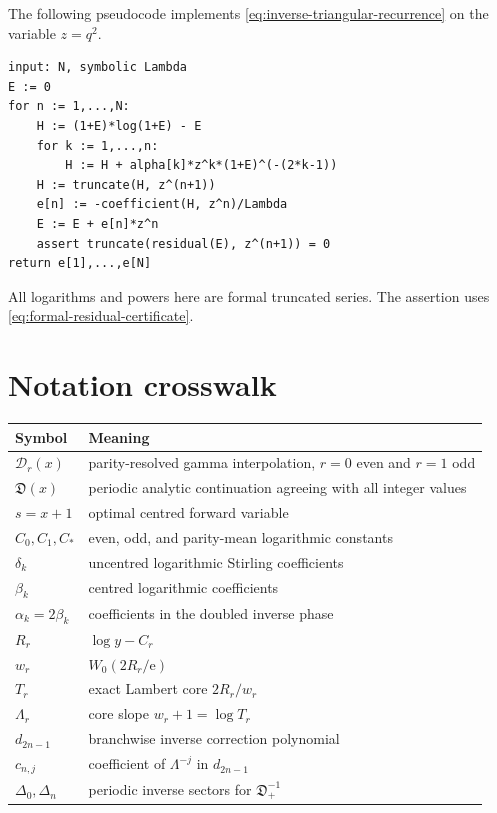 \documentclass[11pt,a4paper,oneside]{article}
\theoremstyle{plain}
\theoremstyle{definition}
\theoremstyle{remark}
\newcommand{\e}{\mathrm e}
\newcommand{\D}{\mathcal D}
\newcommand{\DO}{\mathfrak D}
\begin{document}
The following pseudocode implements \cref{eq:inverse-triangular-recurrence}
on the variable $z=q^2$.
\begin{lstlisting}
input: N, symbolic Lambda
E := 0
for n := 1,...,N:
    H := (1+E)*log(1+E) - E
    for k := 1,...,n:
        H := H + alpha[k]*z^k*(1+E)^(-(2*k-1))
    H := truncate(H, z^(n+1))
    e[n] := -coefficient(H, z^n)/Lambda
    E := E + e[n]*z^n
    assert truncate(residual(E), z^(n+1)) = 0
return e[1],...,e[N]
\end{lstlisting}
All logarithms and powers here are formal truncated series.  The assertion uses
\cref{eq:formal-residual-certificate}.

\section{Notation crosswalk}
\label{app:crosswalk}

\begin{center}
\begin{tabularx}{\textwidth}{@{}lX@{}}
\toprule
Symbol & Meaning\\
\midrule
$\D_r(x)$ & parity-resolved gamma interpolation, $r=0$ even and $r=1$ odd\\
$\DO(x)$ & periodic analytic continuation agreeing with all integer values\\
$s=x+1$ & optimal centred forward variable\\
$C_0,C_1,C_*$ & even, odd, and parity-mean logarithmic constants\\
$\delta_k$ & uncentred logarithmic Stirling coefficients\\
$\beta_k$ & centred logarithmic coefficients\\
$\alpha_k=2\beta_k$ & coefficients in the doubled inverse phase\\
$R_r$ & $\log y-C_r$\\
$w_r$ & $W_0(2R_r/\e)$\\
$T_r$ & exact Lambert core $2R_r/w_r$\\
$\Lambda_r$ & core slope $w_r+1=\log T_r$\\
$d_{2n-1}$ & branchwise inverse correction polynomial\\
$c_{n,j}$ & coefficient of $\Lambda^{-j}$ in $d_{2n-1}$\\
$\Delta_0,\Delta_n$ & periodic inverse sectors for $\DO_+^{-1}$\\
\bottomrule
\end{tabularx}
\end{center}
\end{document}
